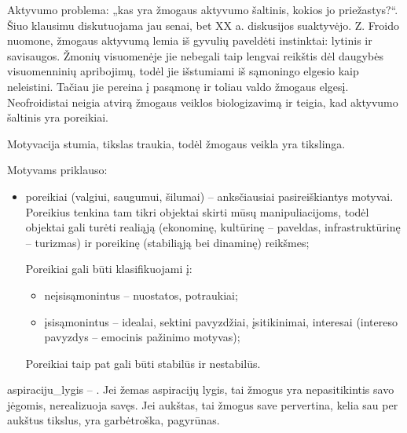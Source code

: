 Aktyvumo problema: „kas yra žmogaus aktyvumo šaltinis, kokios jo priežastys?“.
Šiuo klausimu diskutuojama jau senai, bet XX a. diskusijos suaktyvėjo.
Z. Froido nuomone, žmogaus aktyvumą lemia iš gyvulių paveldėti instinktai:
lytinis ir savisaugos. Žmonių visuomenėje jie nebegali taip lengvai reikštis
dėl daugybės visuomenninių apribojimų, todėl jie išstumiami iš sąmoningo 
elgesio kaip neleistini. Tačiau jie pereina į pasąmonę ir toliau valdo 
žmogaus elgesį. Neofroidistai neigia atvirą žmogaus veiklos biologizavimą ir
teigia, kad aktyvumo šaltinis yra poreikiai.


Motyvacija stumia, tikslas traukia, todėl žmogaus veikla yra tikslinga.

Motyvams priklauso:

\begin{itemize}
  \item poreikiai (valgiui, saugumui, šilumai) – anksčiausiai 
    pasireiškiantys motyvai. Poreikius tenkina tam tikri objektai skirti
    mūsų manipuliacijoms, todėl objektai gali turėti realiąją (ekonominę,
    kultūrinę – paveldas, infrastruktūrinę – turizmas) ir poreikinę 
    (stabiliąją bei dinaminę) reikšmes;

    Poreikiai gali būti klasifikuojami į:
    \begin{itemize}
      \item neįsisąmonintus – nuostatos, potraukiai;
      \item įsisąmonintus – idealai, sektini pavyzdžiai, įsitikinimai,
        interesai (intereso pavyzdys – emocinis pažinimo motyvas);
    \end{itemize}

    Poreikiai taip pat gali būti stabilūs ir nestabilūs.
\end{itemize}


\Gls{aspiraciju_lygis} – . Jei žemas 
aspiracijų lygis, tai žmogus yra nepasitikintis savo jėgomis, nerealizuoja
savęs. Jei aukštas, tai žmogus save pervertina, kelia sau per aukštus
tikslus, yra garbėtroška, pagyrūnas.

